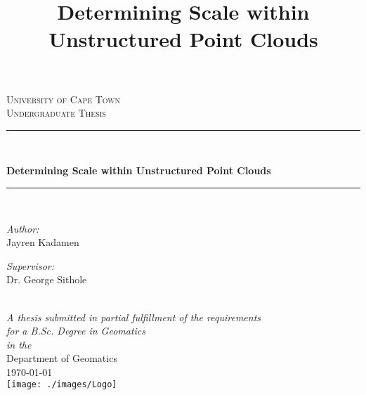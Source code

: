 \documentclass[a4paper, 11pt, oneside,table]{Thesis}  %
\newcommand{\HRule}{\rule{\linewidth}{0.75mm}} %
\begin{document}
\frontmatter	  %

	\begin{center}
		
		\textsc{\LARGE University of Cape Town}\\[1.5cm] %
		\textsc{\Large Undergraduate Thesis}\\[0.5cm] %
		
		\HRule \\[0.4cm] %
		\title{Determining Scale within Unstructured Point Clouds}
		{\huge \bfseries Determining Scale within Unstructured Point Clouds}\\[0.4cm] %
		\HRule \\[1.5cm] %
		
		\begin{minipage}{0.4\textwidth}
			\begin{flushleft} \large
				\emph{Author:}\\
				\textnormal{Jayren Kadamen} %
			\end{flushleft}
		\end{minipage}
		\begin{minipage}{0.4\textwidth}
			\begin{flushright} \large
				\emph{Supervisor:} \\
				\textnormal{Dr. George Sithole} %
			\end{flushright}
		\end{minipage}\\[3cm]
		
		\large \textit{A thesis submitted in partial fulfillment of the requirements\\ for a B.Sc. Degree in Geomatics}\\[0.3cm] %
		\textit{in the}\\[0.4cm]
		Department of Geomatics\\[2cm] %
		
		{\large \today}\\[1cm] %
		\texttt{[image: ./images/Logo]} %
		
		\vfill
	\end{center}
\end{document}

